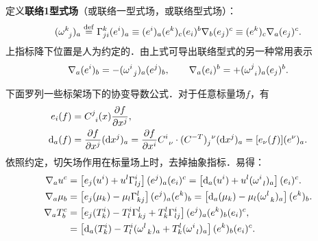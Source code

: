 

定义{\heiti\bfseries 联络1型式场}（或联络一型式场，或联络型式场）：
\begin{equation}\label{chccr:def_1form}
    (\omega_{\hphantom{a} j}^{k})_a \overset{\mathrm {def}}{=} \Gamma_{ji}^k (e^i)_a
    \equiv (e^i)_a (e^k)_c (e_i)^b \nabla _b (e_j)^c
    \equiv (e^k)_c \nabla _a (e_j)^c .
\end{equation}
上指标降下位置是人为约定的．由上式可导出联络型式的另一种常用表示
\begin{equation}\label{chccr:eqn_D-omega-form}
    \nabla _a (e^i)_b= - (\omega_{\hphantom{a} j}^{i})_a (e^j)_b ,\qquad
    \nabla _a (e_i)^b= + (\omega_{\hphantom{a} i}^{j})_a (e_j)^b .
\end{equation}



下面罗列一些标架场下的协变导数公式．对于任意标量场$f$，有
\begin{align}
	{e} _i (f)&= C_{\hphantom{a} i}^{j}(x) \frac{\partial f}{\partial x^j}, \\
	{\rm d}_a (f) &=  \frac{\partial f}{\partial x^j} ({\rm d} x^j)_a
	= \frac{\partial f}{\partial x^i}  C_{\hphantom{a} \nu}^{i}\cdot
	(C^{-T})^{\hphantom{a} \nu}_{j} ({\rm d} x^j)_a
	= [{e} _\nu (f)] (e^\nu)_a .
\end{align}
依照约定，切矢场作用在标量场上时，去掉抽象指标．易得：
\begin{align}
	\nabla_a u^c &= \left[e_j (u^i) + u^l \Gamma^{i}_{lj} \right] (e^j)_a (e_i)^c
	=  \left[{\rm d}_a (u^i) + u^l (\omega_{\hphantom{a} l}^{i})_a \right] (e_i)^c .   \\
	\nabla_a \mu_b &= \left[e_j (\mu_k)-\mu_l \Gamma^{l}_{kj} \right] (e^j)_a (e^k)_b
	=  \left[{\rm d}_a (\mu_k) -\mu_l (\omega_{\hphantom{a} k}^{l})_a \right] (e^k)_b . \\
	\nabla_a T_b^c & = \left[e_j (T_k^i) -T_l^i \Gamma^{l}_{kj}+ T^l_k \Gamma^{i}_{lj} \right]
	(e^j)_a (e^k)_b (e_i)^c,    \label{chccr:eqn_eTg}  \\
	&= \left[{\rm d}_a (T_k^i) -T_l^i (\omega_{\hphantom{a} k}^{l})_a
	+T^l_k (\omega_{\hphantom{a} l}^{i})_a \right] (e^k)_b (e_i)^c  .  \label{chccr:eqn_eTw}
\end{align}



